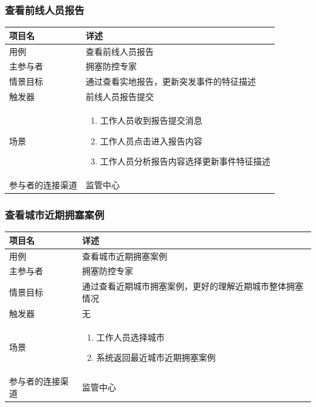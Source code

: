 \documentclass{ctexrep}
\begin{document}
\subsubsection{查看前线人员报告}
\begin{longtable}{p{2cm} | p{10cm}}
\hline
项目名 & 详述 \\
\hline
\hline
用例 & 查看前线人员报告\\
\hline
主参与者 & 拥塞防控专家\\
\hline
情景目标 & 通过查看实地报告，更新突发事件的特征描述 \\
\hline
触发器 & 前线人员报告提交\\
\hline
场景 & \begin{enumerate}
	\item 工作人员收到报告提交消息
	\item 工作人员点击进入报告内容
	\item 工作人员分析报告内容选择更新事件特征描述
\end{enumerate} \\
\hline
参与者的连接渠道 & 监管中心 \\
\hline
\end{longtable}

\subsubsection{查看城市近期拥塞案例}
\begin{longtable}{p{2cm} | p{10cm}}
\hline
项目名 & 详述 \\
\hline
\hline
用例 & 查看城市近期拥塞案例\\
\hline
主参与者 & 拥塞防控专家\\
\hline
情景目标 & 通过查看近期城市拥塞案例，更好的理解近期城市整体拥塞情况 \\
\hline
触发器 & 无\\
\hline
场景 & \begin{enumerate}
	\item 工作人员选择城市
	\item 系统返回最近城市近期拥塞案例
\end{enumerate} \\
\hline
参与者的连接渠道 & 监管中心 \\
\hline
\end{longtable}
\end{document}
